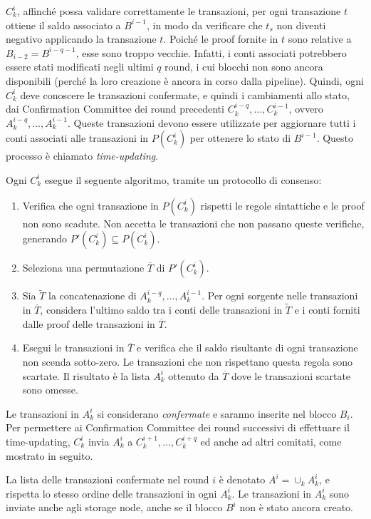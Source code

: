 $C_k^i$, affinché possa validare correttamente le transazioni, per ogni transazione $t$ ottiene il saldo associato a $B^{i-1}$, in modo da verificare che $t_s$ non diventi negativo applicando la transazione $t$. Poiché le proof fornite in $t$ sono relative a $B_{i-2} = B^{i-q-1}$, esse sono troppo vecchie. Infatti, i conti associati potrebbero essere stati modificati negli ultimi $q$ round, i cui blocchi non sono ancora disponibili (perché la loro creazione è ancora in corso dalla pipeline). Quindi, ogni $C_k^i$ deve conoscere le transazioni confermate, e quindi i cambiamenti allo stato, dai Confirmation Committee dei round precedenti $C_k^{i-q}, \dots, C_k^{i-1}$, ovvero $A_k^{i-q}, \dots, A_k^{i-1}$. Queste transazioni devono essere utilizzate per aggiornare tutti i conti associati alle transazioni in $P(C_k^i)$ per ottenere lo stato di $B^{i-1}$. Questo processo è chiamato \emph{time-updating}.

Ogni $C_k^i$ esegue il seguente algoritmo, tramite un protocollo di consenso:

\begin{enumerate}
	\item Verifica che ogni transazione in $P(C_k^i)$ rispetti le regole sintattiche e le proof non sono scadute. Non accetta le transazioni che non passano queste verifiche, generando $P'(C_k^i) \subseteq P(C_k^i)$.
	\item Seleziona una permutazione $\overline{T}$ di $P'(C_k^i)$.
	\item Sia $\widetilde{T}$ la concatenazione di $A_k^{i-q}, \dots, A_k^{i-1}$. Per ogni sorgente nelle transazioni in $\overline{T}$, considera l'ultimo saldo tra i conti delle transazioni in $\widetilde{T}$ e i conti forniti dalle proof delle transazioni in $\overline{T}$.
	\item Esegui le transazioni in $\overline{T}$ e verifica che il saldo risultante di ogni transazione non scenda sotto-zero. Le transazioni che non rispettano questa regola sono scartate. Il risultato è la lista $A_k^i$ ottenuto da $\overline{T}$ dove le transazioni scartate sono omesse.	
\end{enumerate}

Le transazioni in $A_k^i$ si considerano \emph{confermate} e saranno inserite nel blocco $B_i$. Per permettere ai Confirmation Committee dei round successivi di effettuare il time-updating, $C_k^i$ invia $A_k^i$ a $C_k^{i+1}, \dots, C_k^{i+q}$ ed anche ad altri comitati, come mostrato in seguito.

La lista delle transazioni confermate nel round $i$ è denotato $A^i = \cup_k A_k^i$, e rispetta lo stesso ordine delle transazioni in ogni $A_k^i$. Le transazioni in $A_k^i$ sono inviate anche agli storage node, anche se il blocco $B^i$ non è stato ancora creato.

